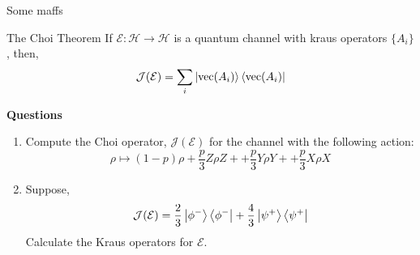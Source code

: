 \documentclass[handout]{beamer}
\renewcommand{\vec}{\text{vec}}
\newcommand{\Hilb}{\mathcal{H}}
\newcommand{\E}{\mathcal{E}}
\newcommand{\J}{\mathcal{J}}
\begin{document}
\begin{frame}{Some maffs}
    \begin{block}{The Choi Theorem}
        If $\E:\Hilb\to\Hilb$ is a quantum channel with kraus operators $\{A_i\}$, then, 
        \[\J(\E) = \sum_i\ket{\vec(A_i)}\bra{\vec(A_i)}\]
        
    \end{block}\pause 
    \textbf{Questions}\pause 
    \begin{enumerate}
        \item     Compute the Choi operator, $\mathcal{J}(\mathcal{E})$ for the channel with the following action:
    \[\rho \mapsto (1-p)\rho + \frac{p}{3}Z\rho Z + + \frac{p}{3} Y\rho Y + + \frac{p}{3}X\rho X\]\pause 
\item     Suppose, 
    \[\J(\E) = \frac{2}{3}\ket{\phi^-}\bra{\phi^-} + \frac{4}{3}\ket{\psi^+}\bra{\psi^+}\]
Calculate the Kraus operators for $\E$.   

    \end{enumerate}

\end{frame}
\end{document}
